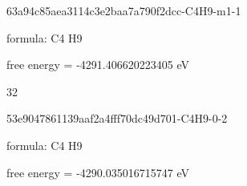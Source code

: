 \documentclass{article}
\begin{document}
\vspace{1cm}


63a94c85aea3114c3e2baa7a790f2dcc-C4H9-m1-1



formula: C4 H9



free energy = -4291.406620223405 eV

32

\vspace{1cm}


53e9047861139aaf2a4fff70dc49d701-C4H9-0-2



formula: C4 H9



free energy = -4290.035016715747 eV
\end{document}
